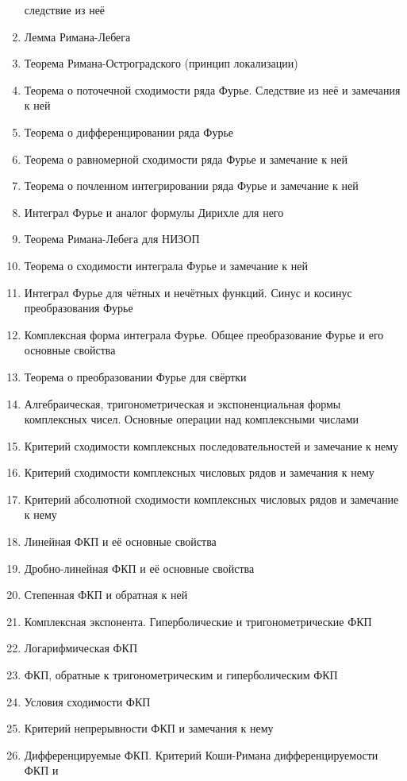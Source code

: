 \documentclass[../main.tex]{subfiles}
\begin{document}
\begin{enumerate}
    следствие из неё
    \item Лемма Римана-Лебега
    \item Теорема Римана-Остроградского (принцип локализации)
    \item Теорема о поточечной сходимости ряда Фурье. Следствие из неё и 
    замечания к ней
    \item Теорема о дифференцировании ряда Фурье
    \item Теорема о равномерной сходимости ряда Фурье и замечание к ней
    \item Теорема о почленном интегрировании ряда Фурье и замечание к ней
    \item Интеграл Фурье и аналог формулы Дирихле для него
    \item Теорема Римана-Лебега для НИЗОП
    \item Теорема о сходимости интеграла Фурье и замечание к ней
    \item Интеграл Фурье для чётных и нечётных функций. Синус и косинус 
    преобразования Фурье
    \item Комплексная форма интеграла Фурье. Общее преобразование Фурье и его 
    основные свойства
    \item Теорема о преобразовании Фурье для свёртки
    \item Алгебраическая, тригонометрическая и экспоненциальная формы 
    комплексных чисел. Основные операции над комплексными числами
    \item Критерий сходимости комплексных последовательностей и замечание к 
    нему
    \item Критерий сходимости комплексных числовых рядов и замечания к нему
    \item Критерий абсолютной сходимости комплексных числовых рядов и 
    замечание к нему
    \item Линейная ФКП и её основные свойства
    \item Дробно-линейная ФКП и её основные свойства
    \item Степенная ФКП и обратная к ней
    \item Комплексная экспонента. Гиперболические и тригонометрические ФКП
    \item Логарифмическая ФКП
    \item ФКП, обратные к тригонометрическим и гиперболическим ФКП
    \item Условия сходимости ФКП
    \item Критерий непрерывности ФКП и замечания к нему
    \item Дифференцируемые ФКП. Критерий Коши-Римана дифференцируемости ФКП и 

\end{enumerate}
\end{document}
